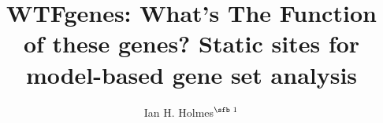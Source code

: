 \documentclass{bioinfo}
\begin{document}

\newcommand\structabs[5]{
\abstract{
{\bf Motivation.}
#1
{\bf Results.}
#2
{\bf Availability and Implementation.}
#3
{\bf Contact.}
#4
{\bf Supplementary Information.}
#5
}
\maketitle
}

\title[WTFgenes]{WTFgenes: What's The Function of these genes? Static sites for model-based gene set analysis}
\author[Ian H. Holmes]{Ian H. Holmes$^{\text{\sfb 1}}$}
\address{$^{\text{\sf 1}}$Department of Bioengineering, University of California, Berkeley, CA 94720, USA}

\corresp{}

\history{}

\editor{}


\end{document}
